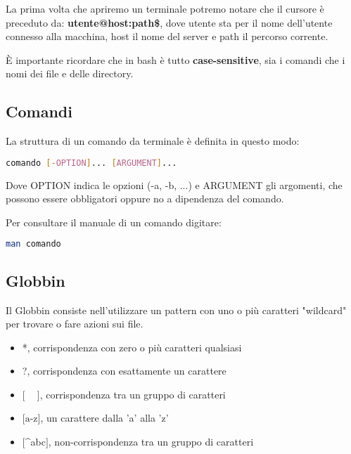 \documentclass[../main.tex]{subfiles}
\begin{document}
La prima volta che apriremo un terminale potremo notare che il cursore è preceduto da: \textbf{utente@host:path\$}, dove utente sta per il nome dell'utente connesso alla macchina, host il nome del server e path il percorso corrente.

È importante ricordare che in bash è tutto \textbf{case-sensitive}, sia i comandi che i nomi dei file e delle directory.

\subsection{Comandi}
La struttura di un comando da terminale è definita in questo modo:
\begin{lstlisting}[language=bash]
comando [-OPTION]... [ARGUMENT]...
\end{lstlisting}
Dove OPTION indica le opzioni (-a, -b, ...) e ARGUMENT gli argomenti, che possono essere obbligatori oppure no a dipendenza del comando.

Per consultare il manuale di un comando digitare:
\begin{lstlisting}[language=bash]
man comando
\end{lstlisting}

\subsection{Globbin}
Il Globbin consiste nell'utilizzare un pattern con uno o più caratteri "wildcard" per trovare o fare azioni sui file.
\begin{itemize}
    \item *, corrispondenza con zero o più caratteri qualsiasi
    \item ?, corrispondenza con esattamente un carattere
    \item $\lbrack \phantom{-} \rbrack$, corrispondenza tra un gruppo di caratteri
    \item $\lbrack \text{a-z} \rbrack$, un carattere dalla 'a' alla 'z'
    \item $\lbrack$\^{}abc$\rbrack$, non-corrispondenza tra un gruppo di caratteri
\end{itemize}
\end{document}
